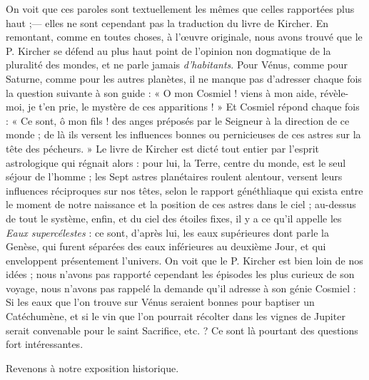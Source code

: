 \documentclass[a4paper, 11pt, oneside]{article}
\begin{document}
On voit que ces paroles sont textuellement les mêmes que celles rapportées plus haut ;--- elles ne sont cependant pas la traduction du livre de Kircher. En remontant, comme en toutes choses, à l'œuvre originale, nous avons trouvé que le P. Kircher se défend au plus haut point de l'opinion non dogmatique de la pluralité des mondes, et ne parle jamais \emph{d'habitants}. Pour Vénus, comme pour Saturne, comme pour les autres planètes, il ne manque pas d'adresser chaque fois la question suivante à son guide : « O mon Cosmiel ! viens à mon aide, révèle-moi, je t'en prie, le mystère de ces apparitions ! » Et Cosmiel répond chaque fois : « Ce sont, ô mon fils ! des anges préposés par le Seigneur à la direction de ce monde ; de là ils versent les influences bonnes ou pernicieuses de ces astres sur la tête des pécheurs. » Le livre de Kircher est dicté tout entier par l'esprit astrologique qui régnait alors : pour lui, la Terre, centre du monde, est le seul séjour de l'homme ; les Sept astres planétaires roulent alentour, versent leurs influences réciproques sur nos têtes, selon le rapport généthliaque qui exista entre le moment de notre naissance et la position de ces astres dans le ciel ; au-dessus de tout le système, enfin, et du ciel des étoiles fixes, il y a ce qu'il appelle les \emph{Eaux supercélestes} : ce sont, d'après lui, les eaux supérieures dont parle la Genèse, qui furent séparées des eaux inférieures au deuxième Jour, et qui enveloppent présentement l'univers. On voit que le P. Kircher est bien loin de nos idées ; nous n'avons pas rapporté cependant les épisodes les plus curieux de son voyage, nous n'avons pas rappelé la demande qu'il adresse à son génie Cosmiel : Si les eaux que l'on trouve sur Vénus seraient bonnes pour baptiser un Catéchumène, et si le vin que l'on pourrait récolter dans les vignes de Jupiter serait convenable pour le saint Sacrifice, etc. ? Ce sont là pourtant des questions fort intéressantes.

Revenons à notre exposition historique.
\end{document}
